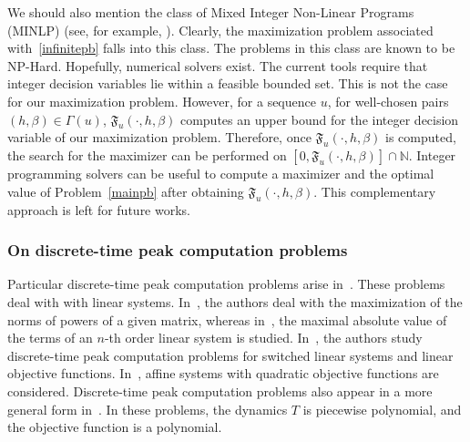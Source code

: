 \documentclass{article}
\def\funset{\Gamma}
\def\Fu{\mathfrak{F}_u}
\def\nn{\mathbb N}
\def\blue#1{#1}
\begin{document}
\blue{	
	We should also mention the class of Mixed Integer Non-Linear Programs (MINLP) (see, for example, \cite{misener2014antigone}). Clearly, the maximization problem associated with~\eqref{infinitepb} falls into this class. The problems in this class are known to be NP-Hard. Hopefully, numerical solvers exist. The current tools require that integer decision variables lie within a feasible bounded set. This is not the case for our maximization problem. However, for a sequence $u$, for well-chosen pairs $(h,\beta)\in\funset(u)$, $\Fu(\cdot,h,\beta)$ computes an upper bound for the integer decision variable of our maximization problem. Therefore, once $\Fu(\cdot,h,\beta)$ is computed, the search for the maximizer can be performed on $[0,\Fu(\cdot,h,\beta)]\cap \nn$. Integer programming solvers can be useful to compute a maximizer and the optimal value of Problem~\ref{mainpb} after obtaining $\Fu(\cdot,h,\beta)$. This complementary approach is left for future works. 
	}
	\blue{
	\subsubsection{On discrete-time peak computation problems}
	Particular discrete-time peak computation problems arise in~\cite{ahiyevich2018upper,dowler2013bounding,polyak2018peak,7984147}. These problems deal with with linear systems. In~\cite{ahiyevich2018upper,dowler2013bounding,7984147}, the authors deal with the maximization of the norms of powers of a given matrix, whereas in~\cite{polyak2018peak}, the maximal absolute value of the terms of an $n$-th order linear system is studied.  In~\cite{ahmadi2025robust}, the authors study discrete-time peak computation problems for switched linear systems and linear objective functions. In~\cite{adje13052025}, affine systems with quadratic objective functions are considered. 
	Discrete-time peak computation problems also appear in a more general form in~\cite{miller2021peakdiscrete}. In these problems, the dynamics $T$ is piecewise polynomial, and the objective function is a polynomial. 
}	
\end{document}
